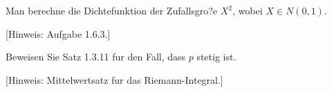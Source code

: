 \begin{aufg}
  Man berechne die Dichtefunktion der Zufallsgro?e $X^2$, wobei $X \in N(0, 1)$.

  [Hinweis: Aufgabe 1.6.3.]
\end{aufg}

\begin{aufg}
  Beweisen Sie Satz 1.3.11 fur den Fall, dass $p$ stetig ist.

  [Hinweis: Mittelwertsatz fur das Riemann-Integral.]
\end{aufg}


